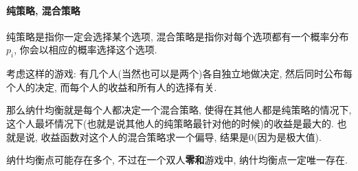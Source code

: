 \paragraph{纯策略, 混合策略} 纯策略是指你一定会选择某个选项, 混合策略是指你对每个选项都有一个概率分布$p_i$, 你会以相应的概率选择这个选项.

考虑这样的游戏: 有几个人(当然也可以是两个)各自独立地做决定, 然后同时公布每个人的决定, 而每个人的收益和所有人的选择有关.

那么纳什均衡就是每个人都决定一个混合策略, 使得在其他人都是纯策略的情况下, 这个人最坏情况下(也就是说其他人的纯策略最针对他的时候)的收益是最大的. 也就是说, 收益函数对这个人的混合策略求一个偏导, 结果是0(因为是极大值).

纳什均衡点可能存在多个, 不过在一个双人\textbf{零和}游戏中, 纳什均衡点一定唯一存在.